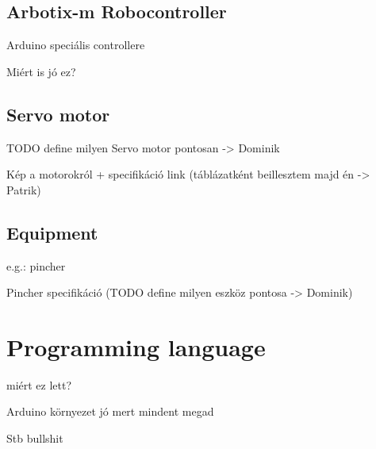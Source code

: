 			\newpage
		
	\subsection{Arbotix-m Robocontroller}
	
		Arduino speciális controllere
		
		Miért is jó ez?

	\subsection{Servo motor}
	
		TODO define milyen Servo motor pontosan -> Dominik
	
		Kép a motorokról + specifikáció link (táblázatként beillesztem majd én -> Patrik)

	\subsection{Equipment}
	e.g.: pincher
	
		Pincher specifikáció (TODO define milyen eszköz pontosa -> Dominik)

\section{Programming language}

miért ez lett?

Arduino környezet jó mert mindent megad 

Stb bullshit
